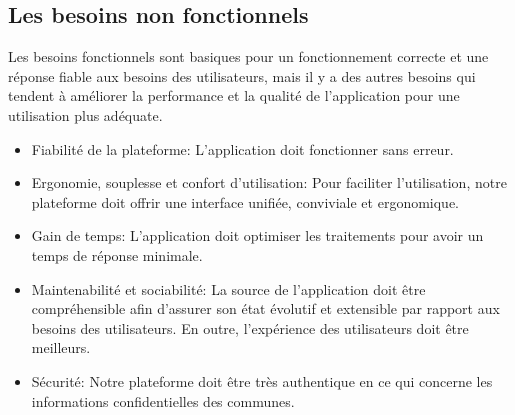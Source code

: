 \documentclass[a4paper]{report}
\begin{document}
\begin{doublespace}
	\subsection{Les besoins non fonctionnels}
	Les besoins fonctionnels sont basiques pour un fonctionnement
	correcte et une réponse fiable aux besoins des utilisateurs, mais il y a des
	autres besoins qui tendent à améliorer la performance et la qualité de
	l'application pour une utilisation plus adéquate.
	\begin{itemize}
		\item Fiabilité de la plateforme: L’application doit
		      fonctionner sans erreur.
		\item Ergonomie, souplesse et confort d’utilisation: Pour
		      faciliter l’utilisation, notre plateforme doit offrir une interface unifiée,
		      conviviale et ergonomique.
		\item Gain de temps: L'application doit optimiser les
		      traitements pour avoir un temps de réponse minimale.
		\item Maintenabilité et sociabilité: La source de l'application doit être compréhensible
		      afin d’assurer son état évolutif et extensible par rapport aux besoins des utilisateurs. En outre, l’expérience des utilisateurs doit être meilleurs.
		\item Sécurité: Notre plateforme doit  être très authentique en ce qui concerne les informations confidentielles des communes.
	\end{itemize}

\end{doublespace}
\end{document}
